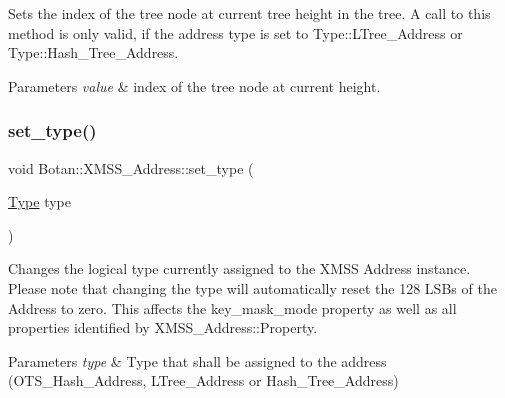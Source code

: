 Sets the index of the tree node at current tree height in the tree. A call to this method is only valid, if the address type is set to Type\+::\+L\+Tree\+\_\+\+Address or Type\+::\+Hash\+\_\+\+Tree\+\_\+\+Address.


\begin{DoxyParams}{Parameters}
{\em value} & index of the tree node at current height. \\
\hline
\end{DoxyParams}
\mbox{\label{class_botan_1_1_x_m_s_s___address_a57148e8e415efce53531406607526236}} 
\subsubsection{\texorpdfstring{set\+\_\+type()}{set\_type()}}
{\footnotesize\ttfamily void Botan\+::\+X\+M\+S\+S\+\_\+\+Address\+::set\+\_\+type (\begin{DoxyParamCaption}\item[{\hyperlink{class_botan_1_1_x_m_s_s___address_a0101e45c5608cf312b497bf6d855000e}{Type}}]{type }\end{DoxyParamCaption})\hspace{0.3cm}{\ttfamily [inline]}}

Changes the logical type currently assigned to the X\+M\+SS Address instance. Please note that changing the type will automatically reset the 128 L\+S\+Bs of the Address to zero. This affects the key\+\_\+mask\+\_\+mode property as well as all properties identified by X\+M\+S\+S\+\_\+\+Address\+::\+Property.


\begin{DoxyParams}{Parameters}
{\em type} & Type that shall be assigned to the address (O\+T\+S\+\_\+\+Hash\+\_\+\+Address, L\+Tree\+\_\+\+Address or Hash\+\_\+\+Tree\+\_\+\+Address) \\
\hline
\end{DoxyParams}
\mbox{\label{class_botan_1_1_x_m_s_s___address_a295db70b7603a66df6ebf20667dc9a9f}} 
